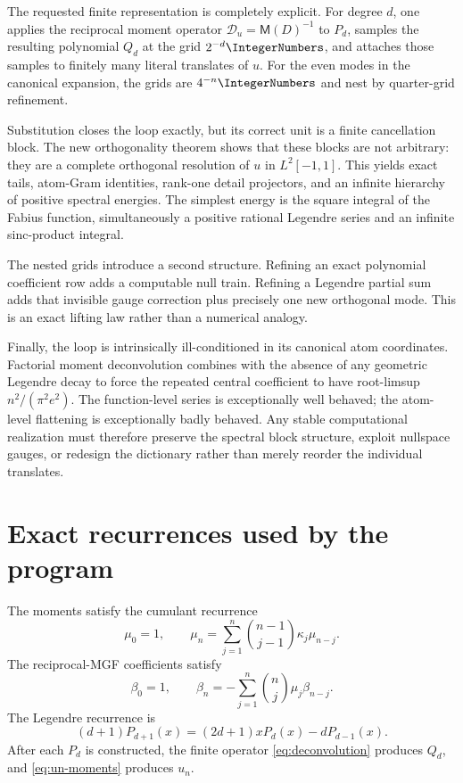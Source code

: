 \documentclass[11pt,oneside]{article}
\numberwithin{equation}{section}
\theoremstyle{definition}
\theoremstyle{remark}
\newcommand{\MM}{\mathsf M}
\newcommand{\Dscr}{\mathscr D_u}
\begin{document}
The requested finite representation is completely explicit.  For degree $d$,
one applies the reciprocal moment operator $\Dscr=\MM(D)^{-1}$ to $P_d$,
samples the resulting polynomial $Q_d$ at the grid $2^{-d}\IntegerNumbers$, and attaches
those samples to finitely many literal translates of $u$.  For the even modes
in the canonical expansion, the grids are $4^{-n}\IntegerNumbers$ and nest by quarter-grid
refinement.

Substitution closes the loop exactly, but its correct unit is a finite
cancellation block.  The new orthogonality theorem shows that these blocks are
not arbitrary: they are a complete orthogonal resolution of $u$ in
$L^2[-1,1]$.  This yields exact tails, atom-Gram identities, rank-one detail
projectors, and an infinite hierarchy of positive spectral energies.  The
simplest energy is the square integral of the Fabius function, simultaneously
a positive rational Legendre series and an infinite sinc-product integral.

The nested grids introduce a second structure.  Refining an exact polynomial
coefficient row adds a computable null train.  Refining a Legendre partial sum
adds that invisible gauge correction plus precisely one new orthogonal mode.
This is an exact lifting law rather than a numerical analogy.

Finally, the loop is intrinsically ill-conditioned in its canonical atom
coordinates.  Factorial moment deconvolution combines with the absence of any
geometric Legendre decay to force the repeated central coefficient to have
root-limsup $n^2/(\pi^2e^2)$.  The function-level series is exceptionally
well behaved; the atom-level flattening is exceptionally badly behaved.  Any
stable computational realization must therefore preserve the spectral block
structure, exploit nullspace gauges, or redesign the dictionary rather than
merely reorder the individual translates.

\appendix

\section{Exact recurrences used by the program}
\label{app:recurrences}

The moments satisfy the cumulant recurrence
\begin{equation}
 \mu_0=1,
 \qquad
 \mu_n=\sum_{j=1}^{n}\binom{n-1}{j-1}\kappa_j\mu_{n-j}.
 \label{eq:moment-recurrence}
\end{equation}
The reciprocal-MGF coefficients satisfy
\begin{equation}
 \beta_0=1,
 \qquad
 \beta_n=-\sum_{j=1}^{n}\binom{n}{j}\mu_j\beta_{n-j}.
 \label{eq:beta-recurrence}
\end{equation}
The Legendre recurrence is
\begin{equation}
 (d+1)P_{d+1}(x)=(2d+1)xP_d(x)-dP_{d-1}(x).
 \label{eq:legendre-recurrence}
\end{equation}
After each $P_d$ is constructed, the finite operator
\eqref{eq:deconvolution} produces $Q_d$, and
\eqref{eq:un-moments} produces $u_n$.
\end{document}
